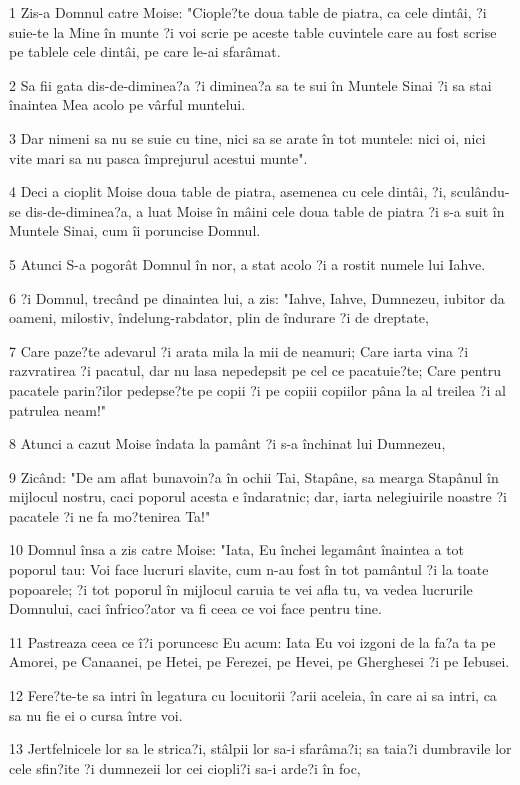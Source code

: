 \par 1 Zis-a Domnul catre Moise: "Ciople?te doua table de piatra, ca cele dintâi, ?i suie-te la Mine în munte ?i voi scrie pe aceste table cuvintele care au fost scrise pe tablele cele dintâi, pe care le-ai sfarâmat.
\par 2 Sa fii gata dis-de-diminea?a ?i diminea?a sa te sui în Muntele Sinai ?i sa stai înaintea Mea acolo pe vârful muntelui.
\par 3 Dar nimeni sa nu se suie cu tine, nici sa se arate în tot muntele: nici oi, nici vite mari sa nu pasca împrejurul acestui munte".
\par 4 Deci a cioplit Moise doua table de piatra, asemenea cu cele dintâi, ?i, sculându-se dis-de-diminea?a, a luat Moise în mâini cele doua table de piatra ?i s-a suit în Muntele Sinai, cum îi poruncise Domnul.
\par 5 Atunci S-a pogorât Domnul în nor, a stat acolo ?i a rostit numele lui Iahve.
\par 6 ?i Domnul, trecând pe dinaintea lui, a zis: "Iahve, Iahve, Dumnezeu, iubitor da oameni, milostiv, îndelung-rabdator, plin de îndurare ?i de dreptate,
\par 7 Care paze?te adevarul ?i arata mila la mii de neamuri; Care iarta vina ?i razvratirea ?i pacatul, dar nu lasa nepedepsit pe cel ce pacatuie?te; Care pentru pacatele parin?ilor pedepse?te pe copii ?i pe copiii copiilor pâna la al treilea ?i al patrulea neam!"
\par 8 Atunci a cazut Moise îndata la pamânt ?i s-a închinat lui Dumnezeu,
\par 9 Zicând: "De am aflat bunavoin?a în ochii Tai, Stapâne, sa mearga Stapânul în mijlocul nostru, caci poporul acesta e îndaratnic; dar, iarta nelegiuirile noastre ?i pacatele ?i ne fa mo?tenirea Ta!"
\par 10 Domnul însa a zis catre Moise: "Iata, Eu închei legamânt înaintea a tot poporul tau: Voi face lucruri slavite, cum n-au fost în tot pamântul ?i la toate popoarele; ?i tot poporul în mijlocul caruia te vei afla tu, va vedea lucrurile Domnului, caci înfrico?ator va fi ceea ce voi face pentru tine.
\par 11 Pastreaza ceea ce î?i poruncesc Eu acum: Iata Eu voi izgoni de la fa?a ta pe Amorei, pe Canaanei, pe Hetei, pe Ferezei, pe Hevei, pe Gherghesei ?i pe Iebusei.
\par 12 Fere?te-te sa intri în legatura cu locuitorii ?arii aceleia, în care ai sa intri, ca sa nu fie ei o cursa între voi.
\par 13 Jertfelnicele lor sa le strica?i, stâlpii lor sa-i sfarâma?i; sa taia?i dumbravile lor cele sfin?ite ?i dumnezeii lor cei ciopli?i sa-i arde?i în foc,
